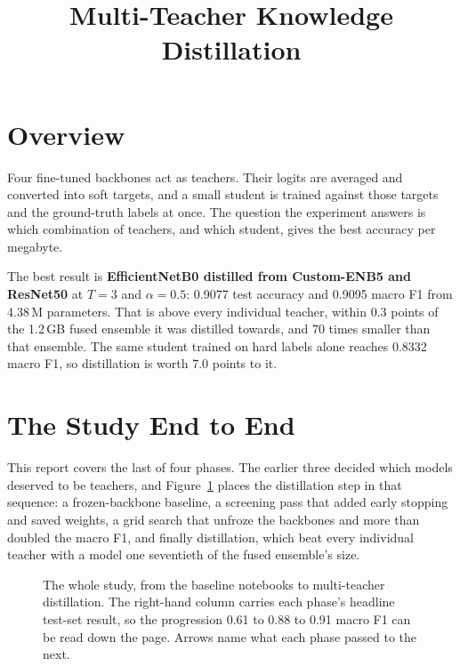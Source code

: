 \documentclass[10pt,letterpaper]{article}
\title{Multi-Teacher Knowledge Distillation}
\author{}
\date{}
\begin{document}
\maketitle

\section{Overview}
Four fine-tuned backbones act as teachers. Their logits are averaged and converted into soft targets, and a
small student is trained against those targets and the ground-truth labels at once. The question the
experiment answers is which combination of teachers, and which student, gives the best accuracy per
megabyte.

The best result is \textbf{EfficientNetB0 distilled from Custom-ENB5 and ResNet50} at $T=3$ and
$\alpha=0.5$: 0.9077 test accuracy and 0.9095 macro F1 from 4.38\,M parameters. That is above every
individual teacher, within 0.3 points of the 1.2\,GB fused ensemble it was distilled towards, and 70 times
smaller than that ensemble. The same student trained on hard labels alone reaches 0.8332 macro F1, so distillation is worth
7.0 points to it.

\section{The Study End to End}
This report covers the last of four phases. The earlier three decided which models deserved to be
teachers, and Figure~\ref{fig:study} places the distillation step in that sequence: a frozen-backbone
baseline, a screening pass that added early stopping and saved weights, a grid search that unfroze the
backbones and more than doubled the macro F1, and finally distillation, which beat every individual
teacher with a model one seventieth of the fused ensemble's size.

\begin{figure}[H]
\centering
\resizebox{\textwidth}{!}{}
\caption{The whole study, from the baseline notebooks to multi-teacher distillation. The right-hand column
carries each phase's headline test-set result, so the progression 0.61 to 0.88 to 0.91 macro F1 can be read
down the page. Arrows name what each phase passed to the next.}
\label{fig:study}
\end{figure}
\FloatBarrier
\end{document}
